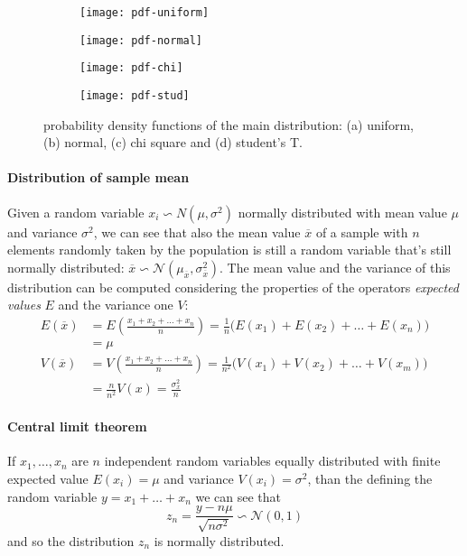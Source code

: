 	\begin{figure}[bhtp]
		\centering
		\begin{subfigure}{0.48 \linewidth}
			\centering \texttt{[image: pdf-uniform]}
			\caption{}
		\end{subfigure}
		\begin{subfigure}{0.48 \linewidth}
			\centering \texttt{[image: pdf-normal]}
			\caption{}
		\end{subfigure}
		\begin{subfigure}{0.48 \linewidth}
			\centering \texttt{[image: pdf-chi]}
			\caption{}
		\end{subfigure}
		\begin{subfigure}{0.48 \linewidth}
			\centering \texttt{[image: pdf-stud]}
			\caption{}
		\end{subfigure}
	
		\caption{probability density functions of the main distribution: (a) uniform, (b) normal, (c) chi square and (d) student's T.}
	\end{figure}

	\paragraph{Distribution of sample mean} Given a random variable $x_i \backsim N(\mu,\sigma^2)$ normally distributed with mean value $\mu$ and variance $\sigma^2$, we can see that also the mean value $\overline x$ of a sample with $n$ elements randomly taken by the population is still a random variable that's still normally distributed: $\overline x \backsim \mathcal N(\mu_{\overline x}, \sigma_{\overline x}^2)$. The mean value and the variance of this distribution can be computed considering the properties of the operators \textit{expected values} $E$ and the variance one $V$:
	\begin{align*}
		E(\overline x) & = E\left( \frac{x_1+x_2+\dots+x_n}{n}\right) = \frac 1 n\Big( E(x_1) + E(x_2) + \dots + E(x_n) \Big) \\
		& = \mu  \\
		V(\overline x) & = V\left( \frac{x_1+x_2+\dots + x_n}{n} \right) = \frac 1 {n^2} \Big( V(x_1) + V(x_2) + \dots + V(x_m) \Big) \\
		& = \frac n {n^2} V(x) = \frac{\sigma_x^2}{n}
	\end{align*}
	
	\paragraph{Central limit theorem} If $x_1,\dots,x_n$ are $n$ independent random variables equally distributed with finite expected value $E(x_i) = \mu$ and variance $V(x_i) = \sigma^2$, than the defining the random variable $y = x_1+\dots+x_n$ we can see that
	\begin{equation}
		z_n = \frac{y-n\mu}{\sqrt{n\sigma^2}} \backsim \mathcal N(0,1)
	\end{equation}
	and so the distribution $z_n$ is normally distributed.
	
